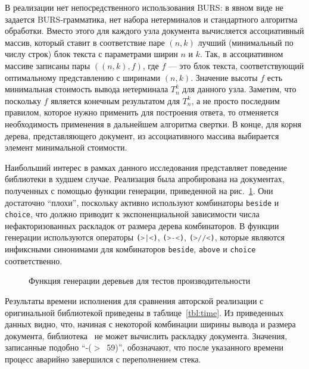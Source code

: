 В реализации нет непосредственного использования BURS: в явном виде не задается BURS-грамматика,
нет набора нетерминалов и стандартного алгоритма обработки.
Вместо этого для каждого узла документа вычисляется ассоциативный массив, который
ставит в соответствие паре $(n, k)$ лучший (минимальный по числу строк) блок текста с параметрами
ширин $n$ и $k$. Так, в ассоциативном массиве записаны пары $((n, k), f)$, где $f$ --- это
блок текста, соответствующий оптимальному представлению с ширинами $(n, k)$. Значение
высоты $f$ есть минимальная стоимость вывода нетерминала $T^k_n$ для данного узла.
Заметим, что поскольку $f$ является конечным результатом для $T^k_n$, а не просто
последним правилом, которое нужно применить для построения ответа, то отменяется
необходимость применения в дальнейшем алгоритма свертки.
В конце, для корня дерева, представляющего документ, из
ассоциативного массива выбирается элемент минимальной стоимости.

Наибольший интерес в рамках данного исследования представляет поведение библиотеки
в худшем случае.
Реализация была апробирована на документах, полученных с помощью
функции генерации, приведенной на рис.~\ref{fig:treeToDocMy}. Они достаточно
``плохи'', поскольку активно используют комбинаторы
\lstinline[language= Haskell]{beside} и
\lstinline[language= Haskell]{choice}, что должно приводит к экспоненциальной зависимости
числа нефакторизованных раскладок от размера дерева комбинаторов.
В функции генерации используются операторы
\lstinline[language= Haskell]{(>|<)},
\lstinline[language= Haskell]{(>-<)},
\lstinline[language= Haskell]{(>//<)}, которые являются инфиксными синонимами для
комбинаторов
\lstinline[language= Haskell]{beside},
\lstinline[language= Haskell]{above} и
\lstinline[language= Haskell]{choice} соответственно.

\begin{figure}[h!]
  
  \caption{Функция генерации деревьев для тестов производительности}
  \label{fig:treeToDocMy}
\end{figure}

Результаты времени исполнения для сравнения авторской реализации с оригинальной библиотекой
приведены в таблице~\ref{tbl:time}.
Из приведенных данных видно, что, начиная с некоторой комбинации ширины вывода и размера документа,
библиотека~\cite{swierstra} не может вычислить раскладку документа.
Значения, записанные подобно \mbox{``-($>$ 59)''}, обозначают,
что после указанного времени процесс аварийно завершился с переполнением стека.

